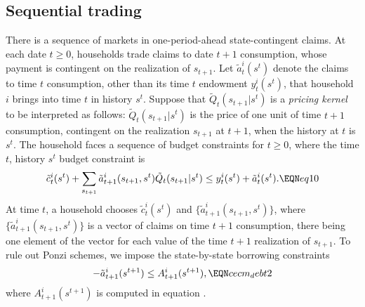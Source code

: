 \subsection{Sequential trading}
There is a sequence of markets in one-period-ahead
state-contingent
 claims.    At each date $t \geq 0$,
households trade claims to date $t+1$ consumption, whose payment
is  contingent
on the realization of $s_{t+1}$.   Let $\tilde a_t^i(s^t)$ denote the
claims to time $t$ consumption, other than its time $t$  endowment $y_t^i(s^t)$,
that household $i$ brings into time $t$ in history $s^t$. Suppose that
$ \tilde Q_t(s_{t+1} | s^t)$
is a {\it pricing kernel}  to be interpreted as follows:
$\tilde Q_t(s_{t+1} | s^t)$ is the price of one unit of time $t+1$ consumption,
contingent on the realization $s_{t+1}$ at $t+1$, when the
history at $t$ is $s^t$.
The household faces a sequence of budget constraints
for $t \geq 0$, where the time $t$, history $s^t$ budget constraint is
$$ \tilde c_t^i(s^t) + \sum_{s_{t+1}} \tilde a^i_{t+1}(s_{t+1},s^t) \tilde Q_t(s_{t+1} | s^t)
     \leq  y_t^i(s^t) + \tilde a_t^i(s^t) . \EQN eq10   $$
At time $t$, a household chooses $\tilde c^i_t(s^t)$
and $\{\tilde a^i_{t+1}(s_{t+1},s^t)\}$, where
$\{\tilde a^i_{t+1}(s_{t+1},s^t)\}$  is a vector of claims on time $t+1$ consumption,
there being one element of the vector for each  value of the time $t+1$ realization of
$s_{t+1}$.    To rule out Ponzi schemes,
we impose the state-by-state borrowing
constraints
$$ -  \tilde a^i_{t+1}(s^{t+1}) \leq  A^i_{t+1}(s^{t+1}),        \EQN cecm_debt2$$
where $A^i_{t+1}(s^{t+1})$ is computed in equation .


